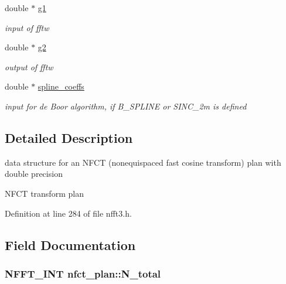 \begin{DoxyCompactItemize}
\item 
\hypertarget{structnfct__plan_a597e9fd4dddb36748c5e33ee1f058835}{double $\ast$ \hyperlink{structnfct__plan_a597e9fd4dddb36748c5e33ee1f058835}{g1}}\label{structnfct__plan_a597e9fd4dddb36748c5e33ee1f058835}

\begin{DoxyCompactList}\small\item\em input of fftw \end{DoxyCompactList}\item 
\hypertarget{structnfct__plan_ac4c375e593da728a4e7477f76ff12031}{double $\ast$ \hyperlink{structnfct__plan_ac4c375e593da728a4e7477f76ff12031}{g2}}\label{structnfct__plan_ac4c375e593da728a4e7477f76ff12031}

\begin{DoxyCompactList}\small\item\em output of fftw \end{DoxyCompactList}\item 
\hypertarget{structnfct__plan_a53242b3a71b8997bdcd173777146c427}{double $\ast$ \hyperlink{structnfct__plan_a53242b3a71b8997bdcd173777146c427}{spline\-\_\-coeffs}}\label{structnfct__plan_a53242b3a71b8997bdcd173777146c427}

\begin{DoxyCompactList}\small\item\em input for de Boor algorithm, if B\-\_\-\-S\-P\-L\-I\-N\-E or S\-I\-N\-C\-\_\-2m is defined \end{DoxyCompactList}\end{DoxyCompactItemize}


\subsection{Detailed Description}
data structure for an N\-F\-C\-T (nonequispaced fast cosine transform) plan with double precision 

N\-F\-C\-T transform plan 

Definition at line 284 of file nfft3.\-h.



\subsection{Field Documentation}
\hypertarget{structnfct__plan_ad119bec761dbb42920ac1deafd68c8f2}{
\subsubsection[{N\-\_\-total}]{\setlength{\rightskip}{0pt plus 5cm}N\-F\-F\-T\-\_\-\-I\-N\-T nfct\-\_\-plan\-::\-N\-\_\-total}}\label{structnfct__plan_ad119bec761dbb42920ac1deafd68c8f2}


